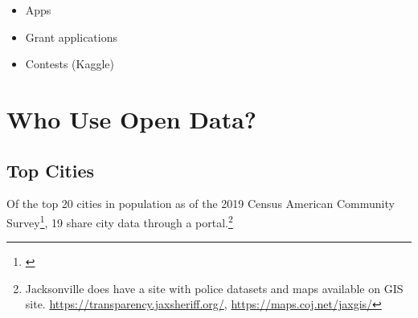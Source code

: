 \documentclass[
  openany]{book}
\providecommand{\tightlist}{%
  \setlength{\itemsep}{0pt}\setlength{\parskip}{0pt}}
\begin{document}
\begin{itemize}
\tightlist
\item
  Apps
\item
  Grant applications
\item
  Contests (Kaggle)
\end{itemize}

\hypertarget{who-use-open-data}{%
\section{Who Use Open Data?}\label{who-use-open-data}}

\hypertarget{top-cities}{%
\subsection{Top Cities}\label{top-cities}}

Of the top 20 cities in population as of the 2019 Census American Community Survey\footnote{\citet{acs2019}}, 19 share city data through a portal.\footnote{Jacksonville does have a site with police datasets and maps available on GIS site. \url{https://transparency.jaxsheriff.org/}, \url{https://maps.coj.net/jaxgis/}}
\end{document}
